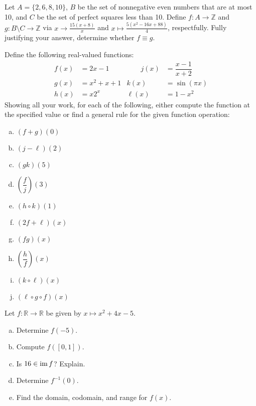 \documentclass[11pt,letterpaper]{article}
\begin{document}

 Let $A= \{ 2, 6, 8, 10 \}$, $B$ be the set of nonnegative even numbers that are at most 10, and $C$ be the set of perfect squares less than 10. Define $f: A \to \mathbb{Z}$ and $g: B \setminus C \to \mathbb{Z}$ via $x \to \frac{15(x + 8)}{x}$ and $x \mapsto \frac{5(x^2 - 16x + 88)}{4}$, respectfully. Fully justifying your answer, determine whether $f \equiv g$. \pspace



\newpage



 Define the following real-valued functions:
	\[
	\begin{aligned}
	f(x)&= 2x - 1 &\qquad j(x)&= \dfrac{x - 1}{x + 2} \\
	g(x)&= x^2 + x + 1 & k(x)&= \sin(\pi x) \\
	h(x)&= x 2^x & \ell(x)&= 1 - x^2
	\end{aligned}
	\]
Showing all your work, for each of the following, either compute the function at the specified value or find a general rule for the given function operation:
	\begin{enumerate}[(a)]
	\item $(f + g)(0)$
	\item $(j - \ell)(2)$
	\item $(gk)(5)$
	\item $\left( \dfrac{f}{j} \right) (3)$
	\item $(h \circ k)(1)$
	\item $(2f + \ell)(x)$
	\item $(fg)(x)$
	\item $\left( \dfrac{h}{f} \right)(x)$
	\item $(k \circ \ell)(x)$
	\item $(\ell \circ g \circ f)(x)$
	\end{enumerate}



\newpage



 Let $f: \mathbb{R} \to \mathbb{R}$ be given by $x \mapsto x^2 + 4x - 5$.
	\begin{enumerate}[(a)]
	\item Determine $f(-5)$.
	\item Compute $f([0,1])$.
	\item Is $16 \in \operatorname{im} f$? Explain. 
	\item Determine $f^{-1}(0)$.
	\item Find the domain, codomain, and range for $f(x)$. 
	\end{enumerate}
\end{document}
